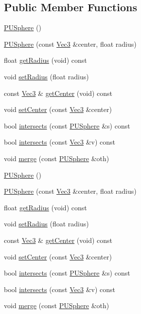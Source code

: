 \subsection*{Public Member Functions}
\begin{DoxyCompactItemize}
\item 
\hyperlink{classPUSphere_af6833d29a3b5fecb8f29d98c1827a7bb}{P\+U\+Sphere} ()
\item 
\hyperlink{classPUSphere_a91c8a4763bfba145f5a93309f92ed9de}{P\+U\+Sphere} (const \hyperlink{classVec3}{Vec3} \&center, float radius)
\item 
float \hyperlink{classPUSphere_addc27e2bf80742bf0a15ec81ceb94e97}{get\+Radius} (void) const
\item 
void \hyperlink{classPUSphere_ab3161b9e553ed38c311fd4bff5dba3f9}{set\+Radius} (float radius)
\item 
const \hyperlink{classVec3}{Vec3} \& \hyperlink{classPUSphere_a082ae4c40dd72db44015d9024b91edf5}{get\+Center} (void) const
\item 
void \hyperlink{classPUSphere_ae656af3bcf247af6b4c21b303e543441}{set\+Center} (const \hyperlink{classVec3}{Vec3} \&center)
\item 
bool \hyperlink{classPUSphere_a904b2983de3bcdea67ee8fc63ac78833}{intersects} (const \hyperlink{classPUSphere}{P\+U\+Sphere} \&s) const
\item 
bool \hyperlink{classPUSphere_ae3415d519390edc0c4d6c16d43851ab8}{intersects} (const \hyperlink{classVec3}{Vec3} \&v) const
\item 
void \hyperlink{classPUSphere_aa327bfa3036b8f9b0c61127502038f48}{merge} (const \hyperlink{classPUSphere}{P\+U\+Sphere} \&oth)
\item 
\hyperlink{classPUSphere_a578240112ac2f4a13eb19f2c27f29722}{P\+U\+Sphere} ()
\item 
\hyperlink{classPUSphere_a91c8a4763bfba145f5a93309f92ed9de}{P\+U\+Sphere} (const \hyperlink{classVec3}{Vec3} \&center, float radius)
\item 
float \hyperlink{classPUSphere_addc27e2bf80742bf0a15ec81ceb94e97}{get\+Radius} (void) const
\item 
void \hyperlink{classPUSphere_ab3161b9e553ed38c311fd4bff5dba3f9}{set\+Radius} (float radius)
\item 
const \hyperlink{classVec3}{Vec3} \& \hyperlink{classPUSphere_a082ae4c40dd72db44015d9024b91edf5}{get\+Center} (void) const
\item 
void \hyperlink{classPUSphere_ae656af3bcf247af6b4c21b303e543441}{set\+Center} (const \hyperlink{classVec3}{Vec3} \&center)
\item 
bool \hyperlink{classPUSphere_a904b2983de3bcdea67ee8fc63ac78833}{intersects} (const \hyperlink{classPUSphere}{P\+U\+Sphere} \&s) const
\item 
bool \hyperlink{classPUSphere_ae3415d519390edc0c4d6c16d43851ab8}{intersects} (const \hyperlink{classVec3}{Vec3} \&v) const
\item 
void \hyperlink{classPUSphere_aa327bfa3036b8f9b0c61127502038f48}{merge} (const \hyperlink{classPUSphere}{P\+U\+Sphere} \&oth)
\end{DoxyCompactItemize}
